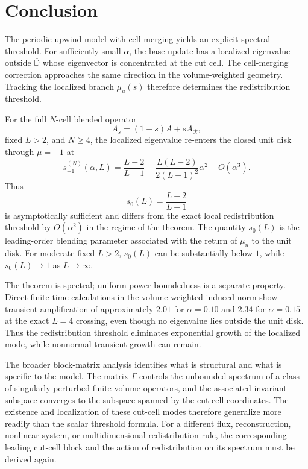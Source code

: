 \documentclass[preprint,12pt]{elsarticle}
\begin{document}
\section{Conclusion}
\label{sec:conclusion}

The periodic upwind model with cell merging yields an explicit spectral
threshold.  For sufficiently small $\alpha$, the base update has a
localized eigenvalue outside $\overline{\mathbb D}$ whose eigenvector is
concentrated at the cut cell.  The cell-merging correction approaches the
same direction in the volume-weighted geometry.  Tracking the localized branch
$\mu_u(s)$ therefore determines the redistribution threshold.

For the full $N$-cell blended operator
\[
    A_s=(1-s)A+sA_{\mathcal R},
\]
fixed $L>2$, and $N\ge4$, the localized eigenvalue re-enters the closed
unit disk through $\mu=-1$ at
\[
 s_{-1}^{(N)}(\alpha,L)
 =
 \frac{L-2}{L-1}
 -
 \frac{L(L-2)}{2(L-1)^2}\alpha^2
 +O(\alpha^3).
\]
Thus
\[
    s_0(L)=\frac{L-2}{L-1}
\]
is asymptotically sufficient and differs from the exact local redistribution
threshold by $O(\alpha^2)$ in the regime of the theorem.  The quantity $s_0(L)$ is the leading-order blending parameter associated
with the return of $\mu_u$ to the unit disk.  For moderate fixed $L>2$, $s_0(L)$ can be substantially below $1$, while
$s_0(L)\to1$ as $L\to\infty$.

The theorem is spectral; uniform power boundedness is a separate property.
Direct finite-time calculations in the volume-weighted induced norm show transient
amplification of approximately $2.01$ for $\alpha=0.10$ and $2.34$ for
$\alpha=0.15$ at the exact $L=4$ crossing, even though no eigenvalue lies
outside the unit disk.  Thus the redistribution threshold eliminates exponential growth of the localized
mode, while nonnormal transient growth can remain.

The broader block-matrix analysis identifies what is structural and what is
specific to the model.  The matrix $\Gamma$ controls the unbounded
spectrum of a class of singularly perturbed finite-volume operators, and the
associated invariant subspace converges to the subspace spanned by the cut-cell coordinates.
The existence and localization of these cut-cell modes therefore generalize
more readily than the scalar threshold formula.  For a different flux,
reconstruction, nonlinear system, or multidimensional redistribution rule,
the corresponding leading cut-cell block and the action of redistribution on its
spectrum must be derived again.
\end{document}
